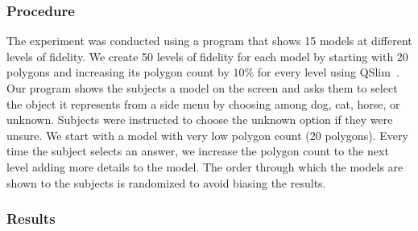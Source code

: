 \subsubsection{Procedure}

The experiment was conducted using a program that shows 15 models at different levels of fidelity.  We create 50 levels of fidelity for each model by starting with 20 polygons and increasing its polygon count by $10\%$ for every level using QSlim~\cite{garland1997}. Our program shows the subjects a model on the screen and asks them to select the object it represents from a side menu by choosing among dog, cat, horse, or unknown. Subjects were instructed to choose the unknown option if they were unsure. We start with a model with very low polygon count (20 polygons). Every time the subject selects an answer, we increase the polygon count to the next level adding more details to the model. The order through which the models are shown to the subjects is randomized to avoid biasing the results. 

\subsubsection{Results}

